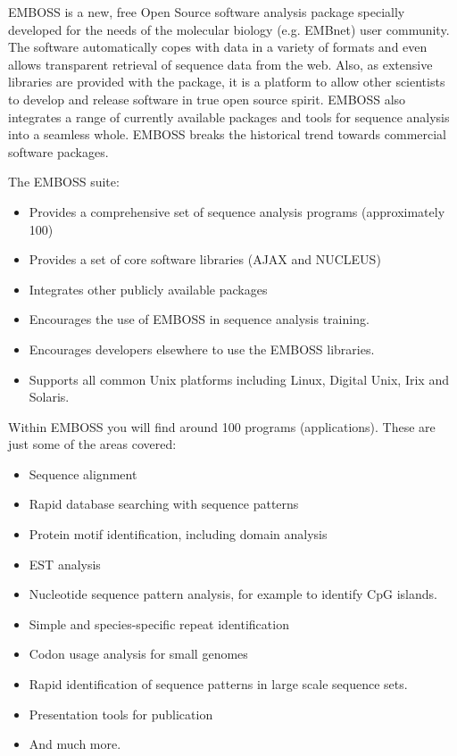 \documentclass[12pt]{report}
\begin{document}
EMBOSS is a new, free Open Source software analysis package specially
 developed for the needs of the molecular biology (e.g.
EMBnet) user community. The software automatically copes with data 
in a variety of formats and even allows transparent retrieval of
sequence data from the web. Also, as extensive libraries are provided 
with the package, it is a platform to allow other scientists to
develop and release software in true open source spirit. EMBOSS also 
integrates a range of currently available packages and tools for
sequence analysis into a seamless whole. EMBOSS breaks the historical 
trend towards commercial software packages. 

The EMBOSS suite: 
\begin{itemize}
\item Provides a comprehensive set of sequence analysis programs (approximately 100) 
\item Provides a set of core software libraries (AJAX and NUCLEUS) 
\item Integrates other publicly available packages 
\item Encourages the use of EMBOSS in sequence analysis training. 
\item Encourages developers elsewhere to use the EMBOSS libraries. 
\item Supports all common Unix platforms including Linux, Digital Unix, Irix and Solaris. 
\end{itemize}

Within EMBOSS you will find around 100 programs (applications). These
are just some of the areas covered:
\begin{itemize}
\item Sequence alignment 
\item Rapid database searching with sequence patterns 
\item Protein motif identification, including domain analysis 
\item EST analysis 
\item Nucleotide sequence pattern analysis, for example to identify CpG islands. 
\item Simple and species-specific repeat identification 
\item Codon usage analysis for small genomes 
\item Rapid identification of sequence patterns in large scale sequence sets. 
\item Presentation tools for publication 
\item And much more. 
\end{itemize}
\end{document}
